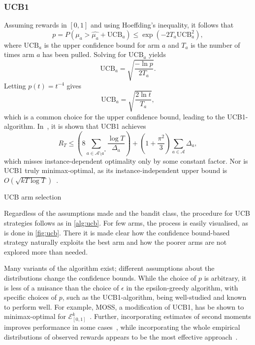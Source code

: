 \subsubsection{UCB1}
Assuming rewards in $[0,1]$ and using Hoeffding's inequality, it follows that
\begin{equation}
    p
    = P(\mu_a > \hat{\mu_a} + \text{UCB}_a)
    \leq \exp(-2T_a \text{UCB}_a^2),
\end{equation}
where $\text{UCB}_a$ is the upper confidence bound for arm $a$ and $T_a$ is the number of times arm $a$ has been pulled.
Solving for $\text{UCB}_a$ yields
\begin{equation}
    \text{UCB}_a = \sqrt{\frac{-\ln p}{2T_a}}.
\end{equation}
Letting $p(t) = t^{-4}$ gives
\begin{equation}
    \text{UCB}_a = \sqrt{\frac{2 \ln t}{T_a}},
\end{equation}
which is a common choice for the upper confidence bound, leading to the UCB1-algorithm.
In~\autocite{auer2002}, it is shown that UCB1 achieves
\begin{equation}
    R_T
    \leq
    \left( 8 \sum_{a \in \mathcal{A} \setminus a^*} \frac{\log T}{\Delta_a} \right)
    + \left(1 + \frac{\pi^2}{3}\right) \sum_{a \in \mathcal{A}} \Delta_a,
\end{equation}
which misses instance-dependent optimality only by some constant factor.
Nor is UCB1 truly minimax-optimal, as its instance-independent upper bound is $O(\sqrt{kT \log T})$~\autocite{bubeck2012}.

\begin{algorithm}
    \caption{UCB arm selection}
    \label{alg:ucb}
     
\end{algorithm}


Regardless of the assumptions made and the bandit class, the procedure for UCB strategies follows as in \cref{alg:ucb}.
For few arms, the process is easily visualised, as is done in \cref{fig:ucb}.
There it is made clear how the confidence bound-based strategy naturally exploits the best arm and how the poorer arms are not explored more than needed.

Many variants of the algorithm exist; different assumptions about the distributions change the confidence bounds.
While the choice of $p$ is arbitrary, it is less of a nuisance than the choice of $\epsilon$ in the epsilon-greedy algorithm, with specific choices of $p$, such as the UCB1-algorithm, being well-studied and known to perform well.
For example, MOSS, a modification of UCB1, has be shown to minimax-optimal for $\mathcal{E}_{[0,1]}^k$~\autocite{audibert2009}.
Further, incorporating estimates of second moments improves performance in some cases~\autocite{audibert2009a}, while incorporating the whole empirical distributions of observed rewards appears to be the most effective approach~\autocite{maillard2011}.


